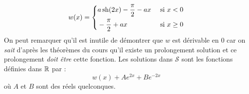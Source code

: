 \begin{enumerate}
\begin{displaymath}
 w(x)=
\left\lbrace 
\begin{aligned}
&a \operatorname{sh}(2x) - \frac{\pi}{2} -ax &\text{ si } x< 0 \\
& - \frac{\pi}{2} +ax &\text{ si } x\geq 0 
\end{aligned}
\right. 
\end{displaymath}
On peut remarquer qu'il est inutile de démontrer que $w$ est dérivable en $0$ car on \emph{sait} d'après les théorèmes du cours qu'il existe un prolongement solution et ce prolongement \emph{doit être}  cette fonction.
Les solutions dans $\mathcal{S}$ sont les fonctions définies dans $\mathbb{R}$ par :
\begin{displaymath}
 w(x) + Ae^{2x} + Be^{-2x}
\end{displaymath}
où $A$ et $B$ sont des réels quelconques.
\end{enumerate}
